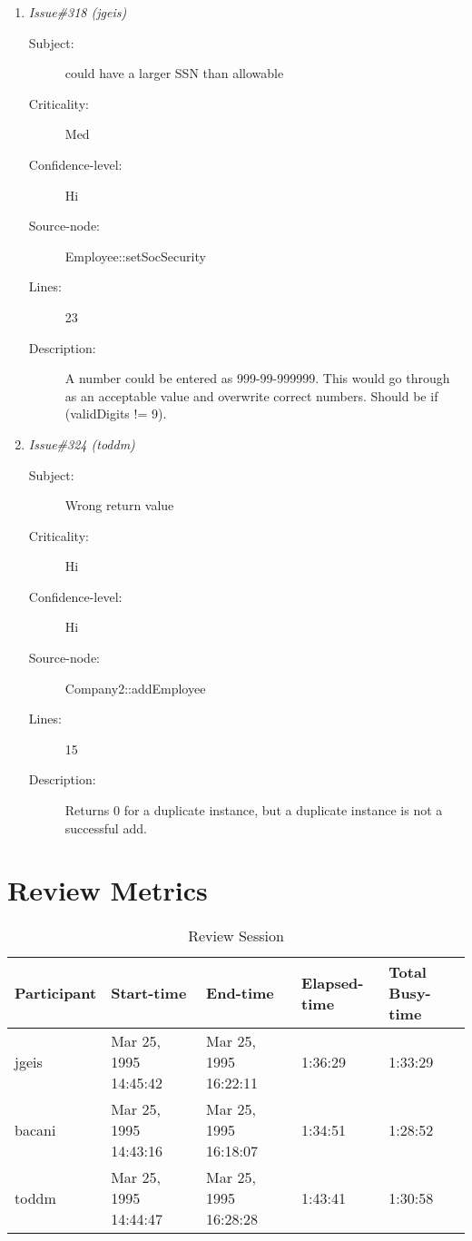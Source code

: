 \begin{enumerate}
\begin{description}
\item [Lines:] 11

\item [Description:] temp is a pointer, delete temp only deletes
the pointer and not what temp actually points to.
\end{description}
\item {\it Issue\#318 (jgeis)}
\begin{description}
\item [Subject:] could have a larger SSN than allowable
\item [Criticality:] Med
\item [Confidence-level:] Hi
\item [Source-node:] Employee::setSocSecurity

\item [Lines:] 23

\item [Description:] A number could be entered as 999-99-999999.
This would go through as an acceptable value and overwrite correct numbers.
Should be if (validDigits != 9).
\end{description}
\item {\it Issue\#324 (toddm)}
\begin{description}
\item [Subject:] Wrong return value
\item [Criticality:] Hi
\item [Confidence-level:] Hi
\item [Source-node:] Company2::addEmployee

\item [Lines:] 15

\item [Description:] Returns 0 for a duplicate instance, but a
duplicate instance is not a successful add.
\end{description}
\end{enumerate}
\section{Review Metrics}
\begin{table}[hb]
\begin{center}
\begin{tabular}{|l|l|l|l|l|}
\hline
Participant & Start-time & End-time & Elapsed-time & Total Busy-time \\
\hline
jgeis & Mar 25, 1995 14:45:42 & Mar 25, 1995 16:22:11 & 1:36:29 & 1:33:29 \\
bacani & Mar 25, 1995 14:43:16 & Mar 25, 1995 16:18:07 & 1:34:51 & 1:28:52 \\
toddm & Mar 25, 1995 14:44:47 & Mar 25, 1995 16:28:28 & 1:43:41 & 1:30:58 \\
\hline
\end{tabular}
\end{center}
\caption{Review Session}
\end{table}


